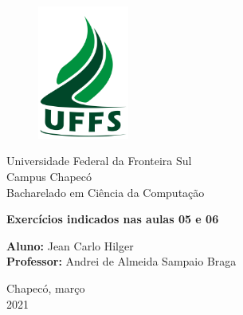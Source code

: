 \documentclass[a4paper, 12pt]{article}
\begin{document}

\begin{titlepage}
	\begin{center}
    	\begin{figure}[!ht]
        	\centering
        	\includegraphics[width=3cm]{./imgs/uffs.png}
    	\end{figure}
    
    	\Huge{Universidade Federal da Fronteira Sul}\\
    	\large{Campus Chapecó}\\ 
    	\large{Bacharelado em Ciência da Computação}\\ 
    	
    	\vspace{15pt}
        \vspace{95pt}
        
        \textbf{\LARGE{Exercícios indicados nas aulas 05 e 06}}\\
    	
        \vspace{3,5cm}
	\end{center}
	
	\begin{flushleft}
	    \begin{tabbing}
			\textbf{Aluno:} Jean Carlo Hilger \\
			\textbf{Professor:} Andrei de Almeida Sampaio Braga \\
        \end{tabbing}
    \end{flushleft}
	
	\vspace{1cm}
	
	\begin{center}
		\vspace{\fill}
		Chapecó, março\\
		2021
	\end{center}
\end{titlepage}
\end{document}
